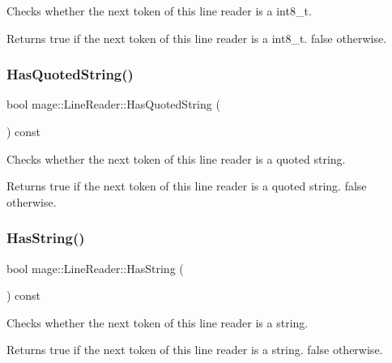 Checks whether the next token of this line reader is a {\ttfamily int8\+\_\+t}.

\begin{DoxyReturn}{Returns}
{\ttfamily true} if the next token of this line reader is a {\ttfamily int8\+\_\+t}. {\ttfamily false} otherwise. 
\end{DoxyReturn}
\hypertarget{classmage_1_1_line_reader_ac92de9a3d986c7031c902c9489cfaa5a}{}\label{classmage_1_1_line_reader_ac92de9a3d986c7031c902c9489cfaa5a} 
\subsubsection{\texorpdfstring{Has\+Quoted\+String()}{HasQuotedString()}}
{\footnotesize\ttfamily bool mage\+::\+Line\+Reader\+::\+Has\+Quoted\+String (\begin{DoxyParamCaption}{ }\end{DoxyParamCaption}) const\hspace{0.3cm}{\ttfamily [protected]}}

Checks whether the next token of this line reader is a quoted string.

\begin{DoxyReturn}{Returns}
{\ttfamily true} if the next token of this line reader is a quoted string. {\ttfamily false} otherwise. 
\end{DoxyReturn}
\hypertarget{classmage_1_1_line_reader_a011b5a0d1bd2d157033e3bf7d7323aed}{}\label{classmage_1_1_line_reader_a011b5a0d1bd2d157033e3bf7d7323aed} 
\subsubsection{\texorpdfstring{Has\+String()}{HasString()}}
{\footnotesize\ttfamily bool mage\+::\+Line\+Reader\+::\+Has\+String (\begin{DoxyParamCaption}{ }\end{DoxyParamCaption}) const\hspace{0.3cm}{\ttfamily [protected]}}

Checks whether the next token of this line reader is a string.

\begin{DoxyReturn}{Returns}
{\ttfamily true} if the next token of this line reader is a string. {\ttfamily false} otherwise. 
\end{DoxyReturn}
\hypertarget{classmage_1_1_line_reader_a15c7c3336330649062556e5b318af510}{}\label{classmage_1_1_line_reader_a15c7c3336330649062556e5b318af510} 
